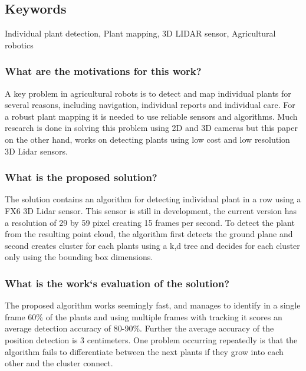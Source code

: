     
    \subsection*{Keywords}
    Individual plant detection, Plant mapping, 3D LIDAR sensor, Agricultural robotics
    
    
     
    
    \subsubsection*{What are the motivations for this work?} 
    A key problem in agricultural robots is to detect and map individual plants for several reasons, including 
    navigation, individual reports and individual care. For a robust plant mapping it is needed to use reliable
    sensors and algorithms. Much research is done in solving this problem 
    using 2D and 3D cameras but this paper on the other hand, works on detecting plants using low cost and low resolution
    3D Lidar sensors. 
    \subsubsection*{What is the proposed solution?}
    The solution contains an algorithm for detecting individual plant in a row using a FX6 3D Lidar sensor. 
    This sensor is still in development, the current version has a resolution of 29 by 59 pixel creating 15 frames per second.
    To detect the plant from the resulting point cloud, the algorithm first detects the ground plane and second  
    creates cluster for each plants using a k,d tree and decides for each cluster only using the bounding box dimensions.
    \subsubsection*{What is the work`s evaluation of the solution?}
    The proposed algorithm works seemingly fast, and manages to identify in a single frame 60\% of the plants
    and using multiple frames with tracking it scores an average detection accuracy of 80-90\%. Further the average accuracy 
    of the position detection is 3 centimeters. One problem occurring repeatedly is that the algorithm fails to differentiate
    between the next plants if they grow into each other and the cluster connect. 
    
